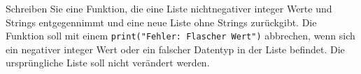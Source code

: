 Schreiben Sie eine Funktion, die eine Liste nichtnegativer integer Werte und Strings entgegennimmt und eine neue Liste ohne Strings zurückgibt. Die Funktion soll mit einem \verb|print("Fehler: Flascher Wert")| abbrechen, wenn sich ein negativer integer Wert oder ein falscher Datentyp in der Liste befindet. Die ursprüngliche Liste soll nicht verändert werden.
